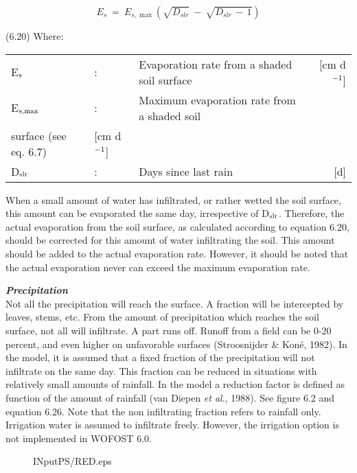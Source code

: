 \begin{equation}
E _{s} ~=~ E _{s,\max } ( \sqrt{D _{slr} } ~-~ \sqrt{D _{slr} \, -\, 1} )
\end{equation}

 
\strut\hfill (6.20)
Where:\\
\begin{tabularx}{\textwidth}{llXr}
E$_{{\rm s}}$ &:& Evaporation rate from a shaded soil surface  & [cm d$^{{\rm -1}}$]\\
E$_{{\rm s,max}}$ &:& Maximum evaporation rate from a shaded soil\\
   surface (see eq. 6.7)  & [cm d$^{{\rm -1}}$]\\
D$_{{\rm slr}}$ &:& Days since last rain  & [d]
\end{tabularx}



When a small amount of water has infiltrated, or rather wetted the soil surface, this
amount can be evaporated the same day, irrespective of D$_{{\rm slr}}$. Therefore, the actual
evaporation from the soil surface, as calculated according to equation 6.20, should be
corrected for this amount of water infiltrating the soil. This amount should be added to
the actual evaporation rate. However, it should be noted that the actual evaporation never
can exceed the maximum evaporation rate.



{\it {\bf Precipitation}\/}\\
Not all the precipitation will reach the surface. A fraction will be intercepted by leaves,
stems, etc. From the amount of precipitation which reaches the soil surface, not all will
infiltrate. A part runs off. Runoff from a field can be 0-20 percent, and even higher on
unfavorable surfaces (Stroosnijder \& Kon\'{e}, 1982). In the model, it is assumed that a
fixed fraction of the precipitation will not infiltrate on the same day. This fraction can be
reduced in situations with relatively small amounts of rainfall. In the model a reduction
factor is defined as function of the amount of rainfall (van Diepen {\it et al\/}., 1988). See 
figure 6.2 and equation 6.26. Note that the non infiltrating fraction refers to rainfall only.
Irrigation water is assumed to infiltrate freely. However, the irrigation option is not
implemented in WOFOST 6.0.

\begin{figure}[htbp]
\begin{forcewidth}{11.06cm}
 \begin{center}INputPS{\FigDir/RED.eps} \end{center}
\end{forcewidth}
\end{figure}




















